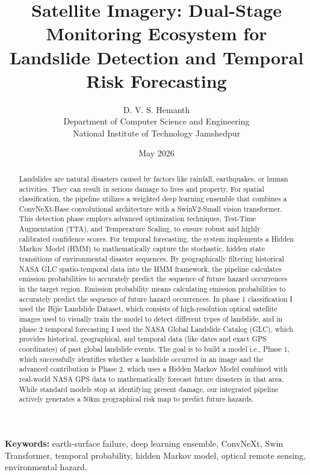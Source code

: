 \documentclass[11pt,a4paper]{article}
\title{Satellite Imagery: Dual-Stage Monitoring Ecosystem for Landslide Detection and Temporal Risk Forecasting}
\author{D. V. S. Hemanth\\
Department of Computer Science and Engineering\\
National Institute of Technology Jamshedpur}
\date{May 2026}
\begin{document}
\maketitle

\begin{abstract}
Landslides are natural disasters caused by factors like rainfall, earthquakes, or human activities. They can result in serious damage to lives and property. For spatial classification, the pipeline utilizes a weighted deep learning ensemble that combines a ConvNeXt-Base convolutional architecture with a SwinV2-Small vision transformer. This detection phase employs advanced optimization techniques, Test-Time Augmentation (TTA), and Temperature Scaling, to ensure robust and highly calibrated confidence scores. For temporal forecasting, the system implements a Hidden Markov Model (HMM) to mathematically capture the stochastic, hidden state transitions of environmental disaster sequences. By geographically filtering historical NASA GLC spatio-temporal data into the HMM framework, the pipeline calculates emission probabilities to accurately predict the sequence of future hazard occurrences in the target region. Emission probability means calculating emission probabilities to accurately predict the sequence of future hazard occurrences. In phase 1 classification I used the Bijie Landslide Dataset, which consists of high-resolution optical satellite images used to visually train the model to detect different types of landslide, and in phase 2 temporal forecasting I used the NASA Global Landslide Catalog (GLC), which provides historical, geographical, and temporal data (like dates and exact GPS coordinates) of past global landslide events. The goal is to build a model i.e., Phase 1, which successfully identifies whether a landslide occurred in an image and the advanced contribution is Phase 2, which uses a Hidden Markov Model combined with real-world NASA GPS data to mathematically forecast future disasters in that area. While standard models stop at identifying present damage, our integrated pipeline actively generates a 50km geographical risk map to predict future hazards.
\end{abstract}

\noindent\textbf{Keywords:} earth-surface failure, deep learning ensemble, ConvNeXt, Swin Transformer, temporal probability, hidden Markov model, optical remote sensing, environmental hazard.
\end{document}
